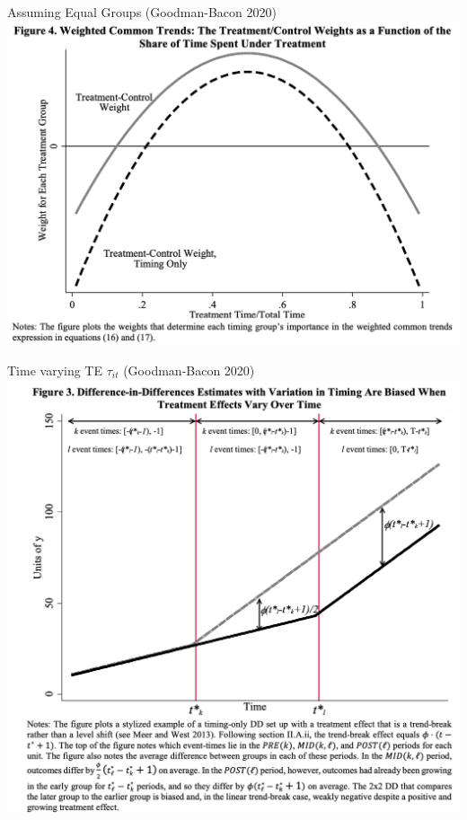 \documentclass[xcolor=pdftex,dvipsnames,table,mathserif,aspectratio=169]{beamer}
\begin{document}
\begin{frame}{Assuming Equal Groups (Goodman-Bacon 2020)}
\centering
\includegraphics[height=0.9\textheight]{resources/gb_fig4.png}
\end{frame}


\begin{frame}{Time varying TE $\tau_{it}$ (Goodman-Bacon 2020)}
\centering
\includegraphics[height=0.9\textheight]{resources/gb_fig3.png}
\end{frame}
\end{document}
